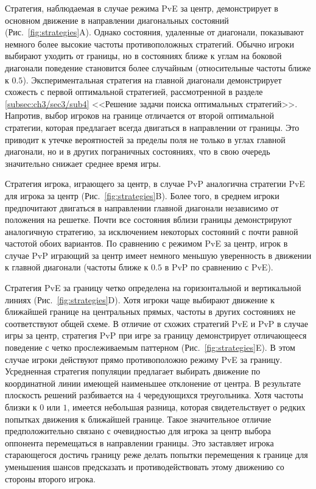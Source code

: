 Стратегия, наблюдаемая в случае режима PvE за центр, демонстрирует в основном движение в направлении диагональных состояний (Рис.~\cref{fig:strategies}A). 
Однако состояния, удаленные от диагонали, показывают немного более высокие частоты противоположных стратегий. 
Обычно игроки выбирают уходить от границы, но в состояниях ближе к углам на боковой диагонали поведение становится более случайным 
(относительные частоты ближе к $0.5$). Экспериментальная стратегия на главной диагонали демонстрирует схожесть с первой оптимальной стратегией, 
рассмотренной в разделе \cref{subsec:ch3/sec3/sub4} <<Решение задачи поиска оптимальных стратегий>>. Напротив, выбор игроков на границе отличается от второй оптимальной стратегии, 
которая предлагает всегда двигаться в направлении от границы. Это приводит к утечке вероятностей за пределы поля не только в углах главной диагонали, 
но и в других пограничных состояниях, что в свою очередь значительно снижает среднее время игры. 

Стратегия игрока, играющего за центр, в случае PvP аналогична стратегии PvE для игрока за центр (Рис.~\cref{fig:strategies}B). 
Более того, в среднем игроки предпочитают двигаться в направлении главной диагонали независимо от положения на решетке. 
Почти все состояния вблизи границы демонстрируют аналогичную стратегию, за исключением некоторых состояний с почти равной частотой обоих вариантов. 
По сравнению с режимом PvE за центр, игрок в случае PvP играющий за центр имеет немного меньшую уверенность в движении к главной диагонали 
(частоты ближе к $0.5$ в PvP по сравнению с PvE).

Стратегия PvE за границу четко определена на горизонтальной и вертикальной линиях (Рис.~\cref{fig:strategies}D). 
Хотя игроки чаще выбирают движение к ближайшей границе на центральных прямых, частоты в других состояниях не соответствуют общей схеме. 
В отличие от схожих стратегий PvE и PvP в случае игры за центр, стратегия PvP при игре за границу демонстрирует отличающееся поведение с четко прослеживаемым паттерном 
(Рис.~\cref{fig:strategies}E). 
В этом случае игроки действуют прямо противоположно режиму PvE за границу. Усредненная стратегия популяции предлагает выбирать движение 
по координатной линии имеющей наименьшее отклонение от центра. В результате плоскость решений разбивается на $4$ чередующихся треугольника. 
Хотя частоты близки к $0$ или $1$, имеется небольшая разница, которая свидетельствует о редких попытках движения к ближайшей границе.
Такое значительное отличие предположительно связано с очевидностью для игрока за центр выбора оппонента перемещаться в направлении границы.
Это заставляет игрока старающегося достичь границу реже делать попытки перемещения к границе для уменьшения шансов предсказать и противодействовать этому движению
со стороны второго игрока.


